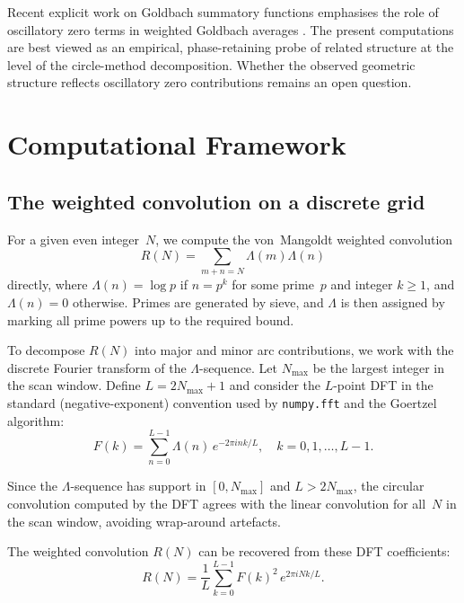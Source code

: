 \documentclass[11pt,a4paper]{article}
\newcommand{\RN}{R(N)}
\begin{document}
Recent explicit work on Goldbach summatory functions emphasises the role of oscillatory zero terms in weighted Goldbach averages \citep{BhowmikHalupczok2018, BhowmikErnvallPalojarvi2025}. The present computations are best viewed as an empirical, phase-retaining probe of related structure at the level of the circle-method decomposition. Whether the observed geometric structure reflects oscillatory zero contributions remains an open question.



\section{Computational Framework}

\subsection{The weighted convolution on a discrete grid}

For a given even integer~$N$, we compute the von~Mangoldt weighted convolution
\begin{equation}
\RN = \sum_{m+n=N} \Lambda(m)\Lambda(n)
\end{equation}
directly, where $\Lambda(n) = \log p$ if $n = p^k$ for some prime~$p$ and integer $k \geq 1$, and $\Lambda(n) = 0$ otherwise. Primes are generated by sieve, and $\Lambda$ is then assigned by marking all prime powers up to the required bound.

To decompose $\RN$ into major and minor arc contributions, we work with the discrete Fourier transform of the $\Lambda$-sequence. Let $N_{\max}$ be the largest integer in the scan window. Define $L = 2N_{\max} + 1$ and consider the $L$-point DFT in the standard (negative-exponent) convention used by \texttt{numpy.fft} and the Goertzel algorithm:
\begin{equation}\label{eq:dft}
F(k) = \sum_{n=0}^{L-1} \Lambda(n)\, e^{-2\pi i n k / L}, \quad k = 0, 1, \ldots, L-1.
\end{equation}

Since the $\Lambda$-sequence has support in $[0, N_{\max}]$ and $L > 2N_{\max}$, the circular convolution computed by the DFT agrees with the linear convolution for all~$N$ in the scan window, avoiding wrap-around artefacts.

The weighted convolution $\RN$ can be recovered from these DFT coefficients:
\begin{equation}\label{eq:recovery}
\RN = \frac{1}{L} \sum_{k=0}^{L-1} F(k)^2\, e^{2\pi i N k / L}.
\end{equation}
\end{document}
